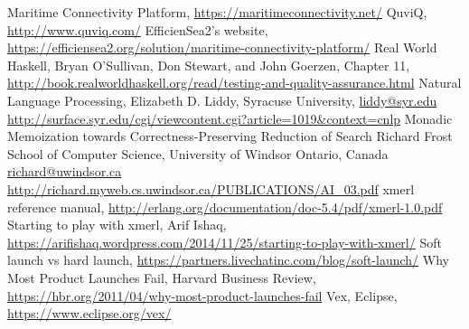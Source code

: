\begin{thebibliography}{9}
		Maritime Connectivity Platform,
		\url{https://maritimeconnectivity.net/}
		QuviQ,
		\url{http://www.quviq.com/}
		EfficienSea2's website,
		\url{https://efficiensea2.org/solution/maritime-connectivity-platform/}
		Real World Haskell,
		Bryan O'Sullivan, Don Stewart, and John Goerzen,
		Chapter 11,
		\url{http://book.realworldhaskell.org/read/testing-and-quality-assurance.html}
		Natural Language Processing,
		Elizabeth D. Liddy,
		Syracuse University,
		\url{liddy@syr.edu}
		\url{http://surface.syr.edu/cgi/viewcontent.cgi?article=1019&context=cnlp}
		Monadic Memoization towards Correctness-Preserving Reduction of Search
		Richard Frost
		School of Computer Science, University of Windsor
		Ontario, Canada
		\url{richard@uwindsor.ca}
		\url{http://richard.myweb.cs.uwindsor.ca/PUBLICATIONS/AI_03.pdf}
		xmerl reference manual,
		\url{http://erlang.org/documentation/doc-5.4/pdf/xmerl-1.0.pdf}
		Starting to play with xmerl,
		Arif Ishaq,
		\url{https://arifishaq.wordpress.com/2014/11/25/starting-to-play-with-xmerl/}
		Soft launch vs hard launch,
		\url{https://partners.livechatinc.com/blog/soft-launch/}
		Why Most Product Launches Fail,
		Harvard Business Review,
		\url{https://hbr.org/2011/04/why-most-product-launches-fail}
		Vex,
		Eclipse,
		\url{https://www.eclipse.org/vex/}
\end{thebibliography}